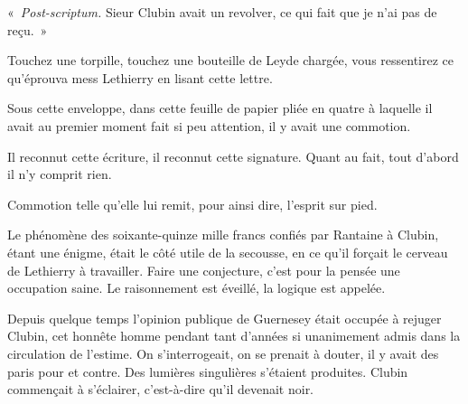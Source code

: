 \documentclass[french,twoside]{book} %
\newcommand{\byline}[1]{\bigskip{\RaggedLeft{#1}\par}\bigskip}
\begin{document}
\byline{« R{\scshape antaine}.}
\bigbreak
\noindent « \emph{Post-scriptum.} Sieur Clubin avait un revolver, ce qui fait que je n’ai pas de reçu. »\par
\bigbreak
\noindent Touchez une torpille, touchez une bouteille de Leyde chargée, vous ressentirez ce qu’éprouva mess Lethierry en lisant cette lettre.\par
Sous cette enveloppe, dans cette feuille de papier pliée en quatre à laquelle il avait au premier moment fait si peu attention, il y avait une commotion.\par
Il reconnut cette écriture, il reconnut cette signature. Quant au fait, tout d’abord il n’y comprit rien.\par
Commotion telle qu’elle lui remit, pour ainsi dire, l’esprit sur pied.\par
Le phénomène des soixante-quinze mille francs confiés par Rantaine à Clubin, étant une énigme, était le côté utile de la secousse, en ce qu’il forçait le cerveau de Lethierry à travailler. Faire une conjecture,  c’est pour la pensée une occupation saine. Le raisonnement est éveillé, la logique est appelée.\par
Depuis quelque temps l’opinion publique de Guernesey était occupée à rejuger Clubin, cet honnête homme pendant tant d’années si unanimement admis dans la circulation de l’estime. On s’interrogeait, on se prenait à douter, il y avait des paris pour et contre. Des lumières singulières s’étaient produites. Clubin commençait à s’éclairer, c’est-à-dire qu’il devenait noir.\par
\end{document}
